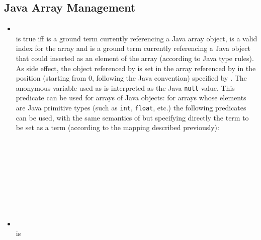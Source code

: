 \subsection{Java Array Management}
\begin{itemize}
%
\item {}\\
\noindent{} is true iff
 is a ground term currently referencing a Java
array object,  is a valid index for the array and
 is a ground term currently referencing a Java object
that could inserted as an element of the array (according to Java
type rules).
%
As side effect, the object referenced by  is set in the
array referenced by  in the position (starting from
0, following the Java convention) specified by .
%
The anonymous variable used as  is interpreted as the
Java \texttt{null} value.
%
This predicate can be used for arrays of Java objects:
%
for arrays whose elements are Java primitive types (such as
\texttt{int}, \texttt{float}, etc.) the following predicates can
be used, with the same semantics of  but
specifying directly the term to be set as a \tuprolog{} term
(according to the mapping described previously):\\
%
\mbox{~~~~}\\
\mbox{~~~~}\\
\mbox{~~~~}\\
\mbox{~~~~}\\
\mbox{~~~~}\\
\mbox{~~~~}\\
\mbox{~~~~}\\
\mbox{~~~~}\\
%
%
%
%
\item {}\\
\noindent{} is

\end{itemize}
